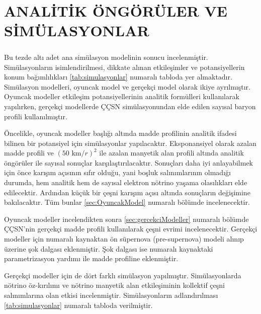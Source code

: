 \newpage
\chapter{ANALİTİK ÖNGÖRÜLER VE SİMÜLASYONLAR}\label{ch:simulasyonlar}
\paragraph{}
Bu tezde altı adet ana simülasyon modelinin sonucu incelenmiştir. Simülasyonların isimlendirilmesi, dikkate alınan etkileşimler ve potansiyellerin konum bağımlılıkları \ref{tab:simulasyonlar} numaralı tabloda yer almaktadır. Simülasyon modelleri, oyuncak model ve gerçekçi model olarak ikiye ayrılmıştır. Oyuncak modeller etkileşim potansiyellerinin analitik formülleri kullanılarak yapılırken, gerçekçi modellerde ÇÇSN simülasyonundan elde edilen sayısal baryon profili kullanılmıştır. 

Öncelikle, oyuncak modeller başlığı altında madde profilinin analitik ifadesi bilinen bir potansiyel için simülasyonlar yapılacaktır. Eksponansiyel olarak azalan madde profili ve $ (50 \text{ km}/r)^{2} $ ile azalan manyetik alan profili altında analitik öngörüler ile sayısal sonuçlar karşılaştırılacaktır. Sonuçları daha iyi anlayabilmek için önce karışım açısının sıfır olduğu, yani boşluk salınımlarının olmadığı durumda, hem analitik hem de sayısal elektron nötrino yaşama olasılıkları elde edilecektir. Ardından küçük bir çeşni karışım açısı altında sonuçların değişimine bakılacaktır. Tüm bunlar \ref{sec:OyuncakModel} numaralı bölümde incelenecektir.

Oyuncak modeller incelendikten sonra \ref{sec:gercekciModeller} numaralı bölümde ÇÇSN'nin gerçekçi madde profili kullanılarak çeşni evrimi incelenecektir. Gerçekçi modeller için \cite{1987ESOC...26..325N} numaralı kaynaktan ön süpernova (pre-supernova) modeli alınıp üzerine şok dalgası eklenmiştir. Şok dalgası ise \cite{Athar:1995cx} numaralı kaynaktaki parametrizasyon yardımı ile madde profiline eklenmiştir.

Gerçekçi modeller için de dört farklı simülasyon yapılmıştır. Simülasyonlarda nötrino öz-kırılımı ve nötrino manyetik alan etkileşiminin kollektif çeşni salınımlarına olan etkisi incelenmiştir. Simülasyonların adlandırılması \ref{tab:simulasyonlar} numaralı tabloda verilmiştir.

